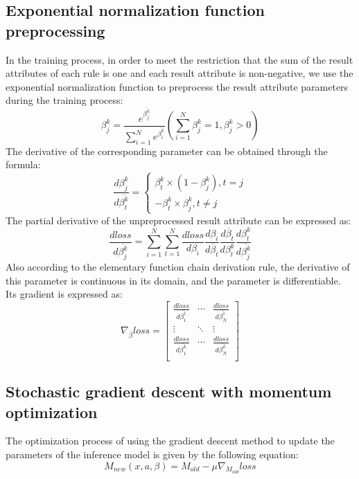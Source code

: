 \documentclass{ieeeaccess}
\begin{document}
\subsection{Exponential normalization function preprocessing}
In the training process, in order to meet the restriction that the sum of the result attributes of each rule is one and each result attribute is non-negative,
we use the exponential normalization function to preprocess the result attribute parameters during the training process:
\begin{equation}
    \beta_j^k=\frac{e^{\overline{\beta_j^k}}}{\sum_{i=1}^Ne^{\overline{\beta_i^k}}}(\sum_{i=1}^N\beta_j^k=1,\beta_j^k>0)
\end{equation}
The derivative of the corresponding parameter can be obtained through the formula:
\begin{equation}
    \frac{d\beta_j^k}{d\overline{\beta_t^k}}=
    \left\{
    \begin{aligned}
        \beta_t^k\times(1-\beta_j^k),t=j \\
        -\beta_t^k\times\beta_j^k,t\neq j
    \end{aligned}
    \right.
\end{equation}
The partial derivative of the unpreprocessed result attribute can be expressed as:
\begin{equation}
    \frac{dloss}{d\overline{\beta_j^k}}=\sum_{i=1}^N\sum_{t=1}^N\frac{dloss}{d\beta_i}\frac{d\beta_i}{d\overline{\beta}_t}\frac{d\overline{\beta}_t}{d\beta_t^k}\frac{d\beta_t^k}{d\overline{\beta_j^k}}
\end{equation}
Also according to the elementary function chain derivation rule, the derivative of this parameter is continuous in its domain,
and the parameter is differentiable. Its gradient is expressed as:
\begin{equation}
    \nabla_{\overline{\beta}}loss=\left[\begin{matrix}
            \frac{dloss}{d\overline{\beta_1^1}} & \cdots & \frac{dloss}{d\overline{\beta_N^1}} \\
            \vdots                              & \ddots & \vdots                              \\
            \frac{dloss}{d\overline{\beta_1^L}} & \cdots & \frac{dloss}{d\overline{\beta_N^L}} \\
        \end{matrix}\right]
\end{equation}


\subsection{Stochastic gradient descent with momentum optimization}
The optimization process of using the gradient descent method to update the parameters of the inference model is given by the following equation:
\begin{equation}
    M_{new}(x,a,\beta)=M_{old}-\mu\nabla_{M_{old}}loss
\end{equation}
\end{document}
